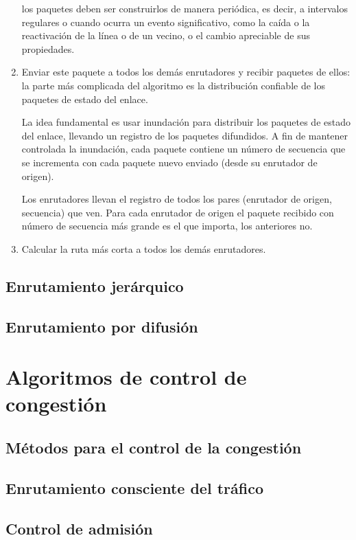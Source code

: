 \documentclass[10pt,a4paper]{report}
\begin{document}
\begin{enumerate}
		\par los paquetes deben ser construirlos de manera periódica, es decir, a 
		intervalos regulares o cuando ocurra un evento significativo, como la caída o la 
		reactivación de la línea o de un vecino, o el cambio apreciable de sus propiedades.

		\item Enviar este paquete a todos los demás enrutadores y recibir paquetes de 		
		ellos: la parte más complicada del algoritmo es la distribución confiable de los 
		paquetes de estado del enlace.
		
		\par La idea fundamental es usar inundación para distribuir los paquetes de 
		estado 
		del enlace, llevando un registro de los paquetes difundidos. A fin de mantener 
		controlada la inundación, cada paquete contiene un número de secuencia que se 
		incrementa con cada paquete nuevo enviado (desde su enrutador de origen).
		\par Los enrutadores llevan el registro de todos los pares (enrutador de origen, 
		secuencia) que ven. Para cada enrutador de origen el paquete recibido con 
		número de secuencia más grande es el que importa, los anteriores no.

		\item Calcular la ruta más corta a todos los demás enrutadores.
	\end{enumerate}

	

\subsection{Enrutamiento jerárquico}
\subsection{Enrutamiento por difusión}
\section{Algoritmos de control de congestión}
\subsection{Métodos para el control de la congestión}
\subsection{Enrutamiento consciente del tráfico}
\subsection{Control de admisión}
\end{document}

